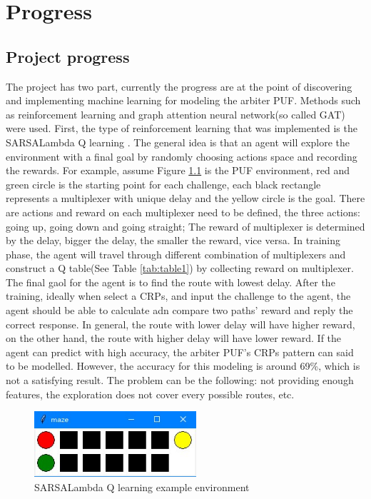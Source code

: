 \chapter{Progress}

\section{Project progress}
The project has two part, currently the progress are at the point of discovering and implementing machine learning for modeling the arbiter PUF. Methods such as reinforcement learning
and graph attention neural network(so called GAT) were used. First, the type of reinforcement learning that was implemented is the SARSALambda Q learning \cite{Reference9}. The general idea is that an agent will 
explore the environment with a final goal by randomly choosing actions space and recording the rewards. For example, assume Figure \ref{fig:figure11} is the PUF environment, red and green circle is the starting point
for each challenge, each black rectangle represents a multiplexer with unique delay and the yellow circle is the goal. There are actions and reward on each multiplexer need to be defined, the three actions: going up, 
going down and going straight; The reward of multiplexer is determined by the delay, bigger the delay, the smaller the reward, vice versa. In training phase, the agent will travel through different combination of 
multiplexers and construct a Q table(See Table \ref{tab:table1}) by collecting reward on multiplexer. The final gaol for the agent is to find the route with lowest delay. After the training, ideally when select a CRPs, 
and input the challenge to the agent, the agent should be able to calculate adn compare two paths' reward and reply the correct response. In general, the route with lower delay will have higher reward, on the other 
hand, the route with higher delay will have lower reward. If the agent can predict with high accuracy, the arbiter PUF's CRPs pattern can said to be modelled. However, the accuracy for this modeling is around 69\%, 
which is not a satisfying result. The problem can be the following: not providing enough features, the exploration does not cover every possible routes, etc. 

\begin{figure}[htp]
    \centering
    \includegraphics[width=6cm]{figures/figure11.jpg}
    \caption{SARSALambda Q learning example environment}
    \label{fig:figure11}
    \end{figure}

